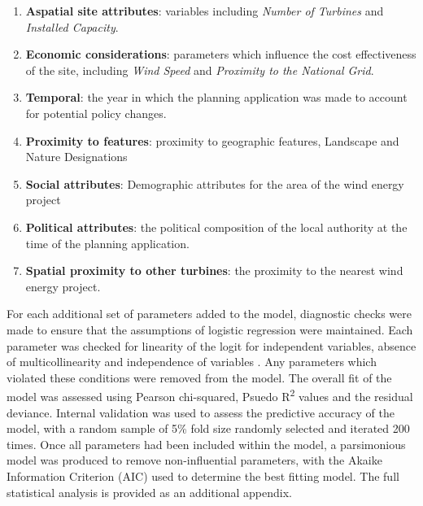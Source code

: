 \documentclass[a4paper,]{article}
\providecommand{\tightlist}{%
  \setlength{\itemsep}{0pt}\setlength{\parskip}{0pt}}
\theoremstyle{definition}
\theoremstyle{definition}
\theoremstyle{definition}
\theoremstyle{remark}
\begin{document}
\begin{enumerate}
\def\labelenumi{\arabic{enumi}.}
\tightlist
\item
  \textbf{Aspatial site attributes}: variables including \emph{Number of Turbines} and \emph{Installed Capacity}.
\item
  \textbf{Economic considerations}: parameters which influence the cost effectiveness of the site, including \emph{Wind Speed} and \emph{Proximity to the National Grid}.
\item
  \textbf{Temporal}: the year in which the planning application was made to account for potential policy changes.
\item
  \textbf{Proximity to features}: proximity to geographic features, Landscape and Nature Designations
\item
  \textbf{Social attributes}: Demographic attributes for the area of the wind energy project
\item
  \textbf{Political attributes}: the political composition of the local authority at the time of the planning application.
\item
  \textbf{Spatial proximity to other turbines}: the proximity to the nearest wind energy project.
\end{enumerate}

For each additional set of parameters added to the model, diagnostic checks were made to ensure that the assumptions of logistic regression were maintained. Each parameter was checked for linearity of the logit for independent variables, absence of multicollinearity and independence of variables \citep{Harrell2001}. Any parameters which violated these conditions were removed from the model. The overall fit of the model was assessed using Pearson chi-squared, Psuedo R\textsuperscript{2} values and the residual deviance. Internal validation was used to assess the predictive accuracy of the model, with a random sample of 5\% fold size randomly selected and iterated 200 times. Once all parameters had been included within the model, a parsimonious model was produced to remove non-influential parameters, with the Akaike Information Criterion (AIC) used to determine the best fitting model. The full statistical analysis is provided as an additional appendix.
\end{document}
